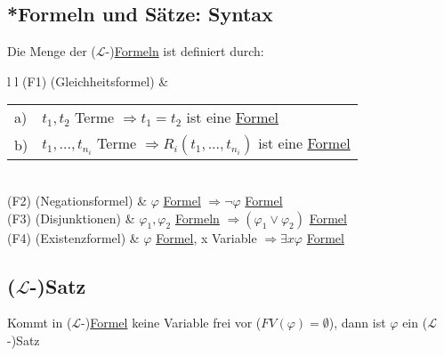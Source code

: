 \documentclass[12pt,a4paper]{article} %
\begin{document}
	\subsection{*Formeln und Sätze: Syntax}
	Die Menge der ($\mathcal{L}$-)\hyperref[Formel]{Formeln} ist definiert durch:
	
	\begin{tabular}{l l}
		(F1) (Gleichheitsformel) & \begin{tabular}{l l}
			a) & $t_1, t_2$ Terme $\Rightarrow t_1 = t_2$ ist eine \hyperref[Formel]{Formel} \\
			b) & $t_1, ..., t_{n_i}$ Terme $\Rightarrow R_i(t_1, ..., t_{n_i})$ ist eine \hyperref[Formel]{Formel}
		\end{tabular} \\
		(F2) (Negationsformel) & $\varphi$ \hyperref[Formel]{Formel} $\Rightarrow \neg \varphi$ \hyperref[Formel]{Formel} \\
		(F3) (Disjunktionen) & $\varphi_1, \varphi_2$ \hyperref[Formel]{Formeln} $\Rightarrow (\varphi_1 \lor \varphi_2)$ \hyperref[Formel]{Formel} \\
		(F4) (Existenzformel) & $\varphi$ \hyperref[Formel]{Formel}, x Variable $\Rightarrow \exists x \varphi$ \hyperref[Formel]{Formel}
	\end{tabular}

	\subsection{($\mathcal{L}$-)Satz}
	\label{LSatz}
	Kommt in ($\mathcal{L}$-)\hyperref[Formel]{Formel} keine Variable frei vor ($FV(\varphi) = \emptyset$), dann ist $\varphi$ ein ($\mathcal{L}$-)Satz
	
\end{document}
